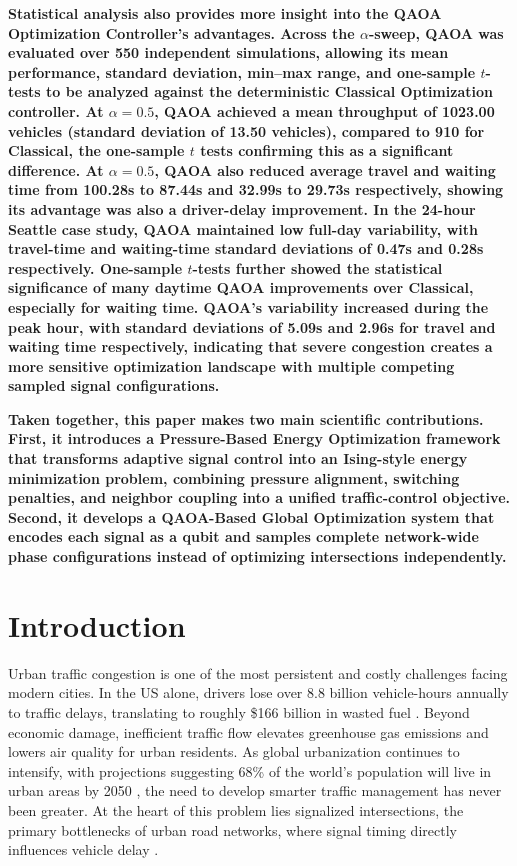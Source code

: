 \documentclass[12pt]{article}
\begin{document}
\textbf{
    Statistical analysis also provides more insight into the QAOA Optimization Controller’s advantages. Across the $\alpha$-sweep, QAOA was evaluated over 550 independent simulations, allowing its mean performance, standard deviation, min--max range, and one-sample $t$-tests to be analyzed against the deterministic Classical Optimization controller. At $\alpha=0.5$, QAOA achieved a mean throughput of 1023.00 vehicles (standard deviation of 13.50 vehicles), compared to 910 for Classical, the one-sample $t$ tests confirming this as a significant difference. At $\alpha=0.5$, QAOA also reduced average travel and waiting time from 100.28s to 87.44s and 32.99s to 29.73s respectively, showing its advantage was also a driver-delay improvement. In the 24-hour Seattle case study, QAOA maintained low full-day variability, with travel-time and waiting-time standard deviations of 0.47s and 0.28s respectively. One-sample $t$-tests further showed the statistical significance of many daytime QAOA improvements over Classical, especially for waiting time. QAOA’s variability increased during the peak hour, with standard deviations of 5.09s and 2.96s for travel and waiting time respectively, indicating that severe congestion creates a more sensitive optimization landscape with multiple competing sampled signal configurations.
}

\textbf{
    Taken together, this paper makes two main scientific contributions. First, it introduces a Pressure-Based Energy Optimization framework that transforms adaptive signal control into an Ising-style energy minimization problem, combining pressure alignment, switching penalties, and neighbor coupling into a unified traffic-control objective. Second, it develops a QAOA-Based Global Optimization system that encodes each signal as a qubit and samples complete network-wide phase configurations instead of optimizing intersections independently.
}

\section{Introduction}

Urban traffic congestion is one of the most persistent and costly challenges facing modern cities. In the US alone, drivers lose over 8.8 billion vehicle-hours annually to traffic delays, translating to roughly \$166 billion in wasted fuel \cite{schrank2019}. Beyond economic damage, inefficient traffic flow elevates greenhouse gas emissions and lowers air quality for urban residents. As global urbanization continues to intensify, with projections suggesting 68\% of the world's population will live in urban areas by 2050 \cite{un2018}, the need to develop smarter traffic management has never been greater. At the heart of this problem lies signalized intersections, the primary bottlenecks of urban road networks, where signal timing directly influences vehicle delay \cite{roess2019,varaiya2013}.
\end{document}
